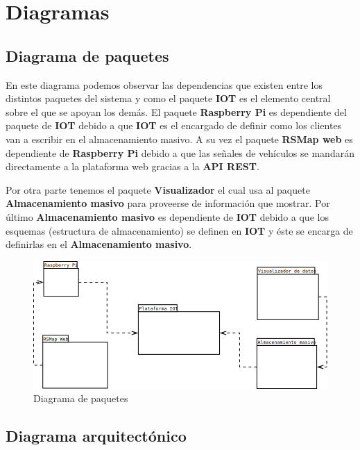 \newpage
\section{Diagramas}
\subsection{Diagrama de paquetes}

En este diagrama podemos observar las dependencias que existen entre los distintos paquetes del sistema y como el paquete \textbf{IOT} es el elemento central sobre el que se apoyan los demás. El paquete \textbf{Raspberry Pi} es dependiente del paquete de \textbf{IOT} debido a que \textbf{IOT} es el encargado de definir como los clientes van a escribir en el almacenamiento masivo. A su vez el paquete \textbf{RSMap web} es dependiente de \textbf{Raspberry Pi} debido a que las señales de vehículos se mandarán directamente a la plataforma web gracias a la \textbf{API REST}.

Por otra parte tenemos el paquete \textbf{Visualizador} el cual usa al paquete \textbf{Almacenamiento masivo} para proveerse de información que mostrar. Por último \textbf{Almacenamiento masivo} es dependiente de \textbf{IOT} debido a que los esquemas (estructura de almacenamiento) se definen en \textbf{IOT} y éste se encarga de definirlas en el \textbf{Almacenamiento masivo}.

\begin{figure}[!ht]
  \begin{center}
    \includegraphics[scale=0.50]{../images/diag_plan/paquetes.png}
    \caption{Diagrama de paquetes}
    \label{fig:paquetes}
  \end{center}
\end{figure}

\newpage

\subsection{Diagrama arquitectónico}

